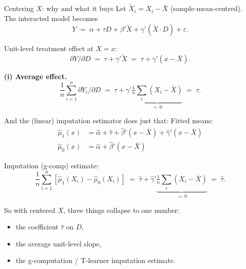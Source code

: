 \documentclass[xcolor=dvipsnames]{beamer}
\begin{document}
\begin{frame}{Centering $X$: why and what it buys}
\small
{} Let $\tilde X_i = X_i - \bar X$ (sample-mean-centred). The interacted model becomes
$$Y \;=\; \alpha + \tau D + \beta' \tilde X + \gamma'(\tilde X \cdot D) + \varepsilon.$$

\medskip
{} Unit-level treatment effect at $X = x$:
$$\partial Y / \partial D \;=\; \tau + \gamma'\tilde X \;=\; \tau + \gamma'(x - \bar X).$$

\medskip
{} \textbf{(i) Average effect.}
$$\frac{1}{n}\sum_{i=1}^n \partial Y_i / \partial D
\;=\; \tau + \gamma' \underbrace{\tfrac{1}{n}\sum_i(X_i - \bar X)}_{=\,0}
\;=\; \tau.$$



\end{frame}


\begin{frame}{And the (linear) imputation estimator does just that:}
\small
{} Fitted means:
\begin{align*}
\widehat{\mu}_1(x) &= \widehat\alpha + \widehat\tau + \widehat\beta'(x - \bar X) + \widehat\gamma'(x - \bar X) \\
\widehat{\mu}_0(x) &= \widehat\alpha + \widehat\beta'(x - \bar X)
\end{align*}

\medskip
{} Imputation (g-comp) estimate:
$$\frac{1}{n}\sum_{i=1}^n \left[\widehat{\mu}_1(X_i) - \widehat{\mu}_0(X_i)\right]
\;=\; \widehat\tau + \widehat\gamma'\underbrace{\tfrac{1}{n}\sum_i (X_i - \bar X)}_{=\,0}
\;=\; \widehat\tau.$$

\medskip
{} So with centered $X$, three things collapse to one number:
\begin{itemize}\itemsep1pt
\item the coefficient $\widehat\tau$ on $D$,
\item the average unit-level slope,
\item the g-computation / T-learner imputation estimate.
\end{itemize}
\end{frame}
\end{document}
